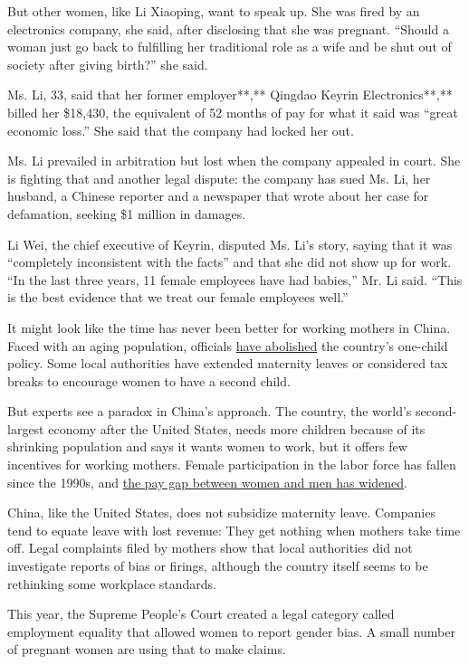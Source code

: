 But other women, like Li Xiaoping, want to speak up. She was fired by an
electronics company, she said, after disclosing that she was pregnant.
``Should a woman just go back to fulfilling her traditional role as a
wife and be shut out of society after giving birth?'' she said.

Ms. Li, 33, said that her former employer**,** Qingdao Keyrin
Electronics**,** billed her \$18,430, the equivalent of 52 months of pay
for what it said was ``great economic loss.'' She said that the company
had locked her out.

Ms. Li prevailed in arbitration but lost when the company appealed in
court. She is fighting that and another legal dispute: the company has
sued Ms. Li, her husband, a Chinese reporter and a newspaper that wrote
about her case for defamation, seeking \$1 million in damages.

Li Wei, the chief executive of Keyrin, disputed Ms. Li's story, saying
that it was ``completely inconsistent with the facts'' and that she did
not show up for work. ``In the last three years, 11 female employees
have had babies,'' Mr. Li said. ``This is the best evidence that we
treat our female employees well.''

It might look like the time has never been better for working mothers in
China. Faced with an aging population, officials
\href{https://www.nytimes3xbfgragh.onion/2015/11/14/world/asia/china-one-child-policy-loneliest-generation.html}{have
abolished} the country's one-child policy. Some local authorities have
extended maternity leaves or considered tax breaks to encourage women to
have a second child.

But experts see a paradox in China's approach. The country, the world's
second-largest economy after the United States, needs more children
because of its shrinking population and says it wants women to work, but
it offers few incentives for working mothers. Female participation in
the labor force has fallen since the 1990s, and
\href{http://www3.weforum.org/docs/WEF_GGGR_2018.pdf}{the pay gap
between women and men has widened}.

China, like the United States, does not subsidize maternity leave.
Companies tend to equate leave with lost revenue: They get nothing when
mothers take time off. Legal complaints filed by mothers show that local
authorities did not investigate reports of bias or firings, although the
country itself seems to be rethinking some workplace standards.

This year, the Supreme People's Court created a legal category called
employment equality that allowed women to report gender bias. A small
number of pregnant women are using that to make claims.

